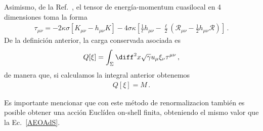 \documentclass[../Main.tex]{subfiles}
\begin{document}
Asimismo, de la Ref.~\cite{balasubramanian1999stress}, el tensor de energía-momentum cuasilocal en 4 dimensiones toma la forma 
\begin{align}
\tau_{\mu\nu}=-2\kappa\sigma\left[K_{\mu\nu}-h_{\mu\nu}K\right] -4\sigma\kappa\left[\frac{1}{\ell}h_{\mu\nu}-\frac{\ell}{2}\left(\mathcal{R}_{\mu\nu}-\frac{1}{2}h_{\mu\nu}\mathcal{R}\right)\right]\, .
\end{align}
De la definición anterior, la carga conservada asociada es 
\begin{align}
Q[\xi]=\int_{\Sigma}\diff^{2}x\sqrt{\gamma}u_{\mu}\xi_{\nu}\tau^{\mu\nu}\, ,
\end{align}
de manera que, si calculamos la integral anterior obtenemos
\begin{align}
    Q[\xi]=M\, . 
\end{align}


Es importante mencionar que con este método de renormalizacion también es posible obtener una acción Euclídea on-shell finita, obteniendo el mismo valor que la Ec.~\eqref{AEOAdS}. 
\end{document}
